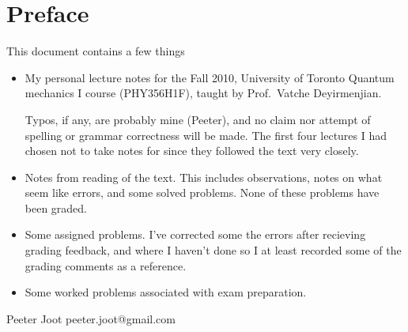 \chapter*{Preface}\normalsize

This document contains a few things

\begin{itemize}
\item My personal lecture notes for the Fall 2010, University of Toronto Quantum mechanics I course (PHY356H1F), taught by Prof.\ Vatche Deyirmenjian.

Typos, if any, are probably mine (Peeter), and no claim nor attempt of spelling or grammar correctness will be made.  The first four lectures I had chosen not to take notes for since they followed the text \cite{desai2009quantum} very closely.

\item Notes from reading of the text.  This includes observations, notes on what seem like errors, and some solved problems.  None of these problems have been graded.

\item Some assigned problems.  I've corrected some the errors after recieving grading feedback, and where I haven't done so I at least recorded some of the grading comments as a reference.

\item Some worked problems associated with exam preparation.

\end{itemize}

Peeter Joot  \quad peeter.joot@gmail.com 
